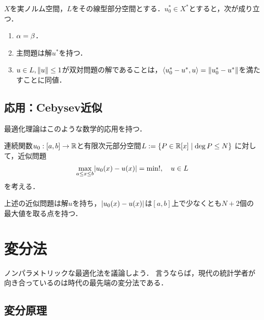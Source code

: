 \documentclass[uplatex,dvipdfmx]{jsreport}
\begin{document}
\begin{theorem}
    $X$を実ノルム空間，$L$をその線型部分空間とする．$u_0^*\in X^*$とすると，次が成り立つ．
    \begin{enumerate}
        \item $\alpha=\beta$．
        \item 主問題は解$u^*$を持つ．
        \item $u\in L,\|u\|\le 1$が双対問題の解であることは，$\langle u_0^*-u^*,u\rangle=\|u^*_0-u^*\|$を満たすことに同値．
    \end{enumerate}
\end{theorem}

\subsection{応用：Cebysev近似}

\begin{tcolorbox}[colframe=ForestGreen, colback=ForestGreen!10!white,breakable,colbacktitle=ForestGreen!40!white,coltitle=black,fonttitle=\bfseries\sffamily,
title=]
    最適化理論はこのような数学的応用を持つ．
\end{tcolorbox}

\begin{definition}
    連続関数$u_0:[a,b]\to\mathbb{R}$と有限次元部分空間$L:=\left\{P\in\mathbb{R}[x]\mid\deg P\le N\right\}$
    に対して，近似問題
    \[\max_{a\le x\le b}\lvert u_0(x)-u(x)\rvert=\min!,\quad u\in L\]
    を考える．
\end{definition}

\begin{proposition}
    上述の近似問題は解$u$を持ち，$\lvert u_0(x)-u(x)\rvert$は$[a,b]$上で少なくとも$N+2$個の最大値を取る点を持つ．
\end{proposition}

\section{変分法}

\begin{tcolorbox}[colframe=ForestGreen, colback=ForestGreen!10!white,breakable,colbacktitle=ForestGreen!40!white,coltitle=black,fonttitle=\bfseries\sffamily,
title=]
    ノンパラメトリックな最適化法を議論しよう．
    言うならば，現代の統計学者が向き合っているのは時代の最先端の変分法である．
\end{tcolorbox}

\subsection{変分原理}
\end{document}
